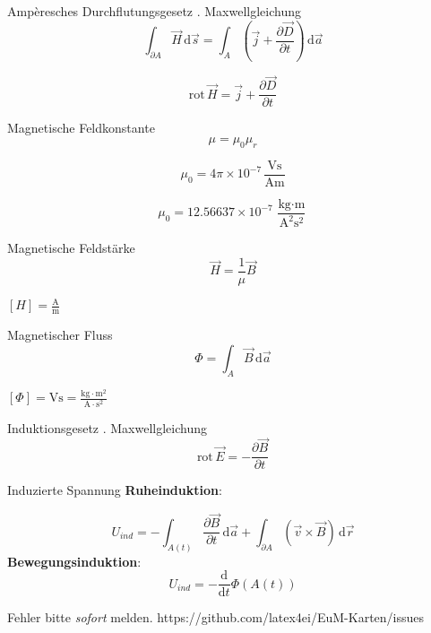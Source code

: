 \documentclass[a7paper]{kartei}
\begin{document}
\begin{karte}[Magnetostatik]{Ampèresches Durchflutungsgesetz}
. Maxwellgleichung
\\
\[
\int_{\partial A} \vec{H} \, \mathrm{d}\vec{s} = \int_A \left(\vec{j} + \frac{\partial \vec{D}}{\partial t}\right) \, \mathrm{d}\vec{a}
\]

\[
\text{rot} \, \vec{H} = \vec{j} + \frac{\partial \vec{D}}{\partial t}
\]

\end{karte}

\begin{karte}[Magnetostatik]{Magnetische Feldkonstante}
\[
\mu = \mu_0 \mu_r
\]

\[
\mu_0 = 4\pi \times 10^{-7} \, \frac{\text{Vs}}{\text{Am}}
\]

\[
\mu_0 = 12.56637 \times 10^{-7} \, \frac{\text{kg} \cdot \text{m}}{\text{A}^2 \text{s}^2}
\]
\end{karte}

\begin{karte}[Magnetostatik]{Magnetische Feldstärke}
\[
\vec{H} = \frac{1}{\mu} \vec{B}
\]

\([H] = \frac{\text{A}}{\text{m}}\)
\end{karte}

\begin{karte}[Magnetostatik]{Magnetischer Fluss}
\[
\Phi = \int_A \vec{B} \, \mathrm{d}\vec{a}
\]

\([\Phi] = \text{Vs} = \frac{\text{kg} \cdot \text{m}^2}{\text{A} \cdot \text{s}^2}\)
\end{karte}

\begin{karte}[Magnetostatik]{Induktionsgesetz}
. Maxwellgleichung
\\
\[
\text{rot} \, \vec{E} = -\frac{\partial \vec{B}}{\partial t}
\]
\end{karte}

\begin{karte}[Magnetostatik]{Induzierte Spannung}
\textbf{Ruheinduktion}:

\[
U_{ind} = -\int_{A(t)} \frac{\partial \vec{B}}{\partial t} \, \mathrm{d}\vec{a} + \int_{\partial A} (\vec{v} \times \vec{B}) \, \mathrm{d}\vec{r}
\]
\textbf{Bewegungsinduktion}:
\[
U_{ind} = -\frac{\mathrm{d}}{\mathrm{d}t} \Phi(A(t))
\]
\end{karte}

\begin{karte}[LaTeX4Ei]{Fehler bitte \textit{sofort} melden.}
\center
https://github.com/latex4ei/EuM-Karten/issues
\end{karte}
\end{document}
